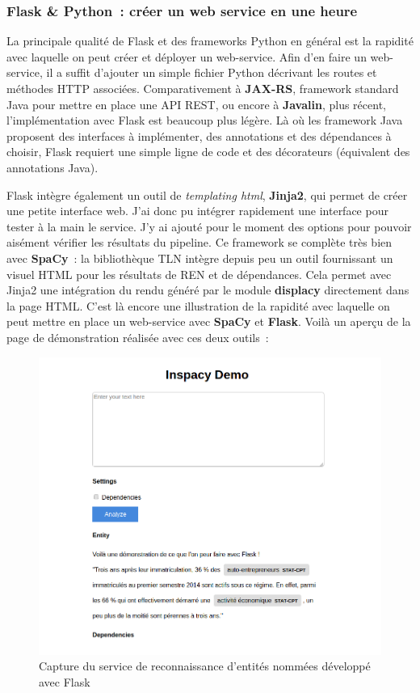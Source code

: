 \subsubsection*{Flask \& Python~: créer un web service en une heure}
La principale qualité de Flask et des frameworks Python en général est la rapidité avec laquelle on peut créer et déployer un web-service. Afin d'en faire un web-service, il a suffit d'ajouter un simple fichier Python décrivant les routes et méthodes HTTP associées. Comparativement à \textbf{JAX-RS}, framework standard Java pour mettre en place une API REST, ou encore à \textbf{Javalin}, plus récent, l'implémentation avec Flask est beaucoup plus légère. Là où les framework Java proposent des interfaces à implémenter, des annotations et des dépendances à choisir, Flask requiert une simple ligne de code et des décorateurs (équivalent des annotations Java).
\newline

Flask intègre également un outil de \textit{templating html}, \textbf{Jinja2}, qui permet de créer une petite interface web. J'ai donc pu intégrer rapidement une interface pour tester à la main le service. J'y ai ajouté pour le moment des options pour pouvoir aisément vérifier les résultats du pipeline. Ce framework se complète très bien avec \textbf{SpaCy}~: la bibliothèque TLN intègre depuis peu un outil fournissant un visuel HTML pour les résultats de REN et de dépendances. Cela permet avec Jinja2 une intégration du rendu généré par le module \textbf{displacy} directement dans la page HTML. C'est là encore une illustration de la rapidité avec laquelle on peut mettre en place un web-service avec \textbf{SpaCy} et \textbf{Flask}. Voilà un aperçu de la page de démonstration réalisée avec ces deux outils~:
\begin{figure}[H]
    \centering
    \includegraphics[scale=0.6]{images/inspaCy-demo.png}
    \caption{Capture du service de reconnaissance d'entités nommées développé avec Flask}
    \label{fig:demo-inspaCy}
\end{figure}

